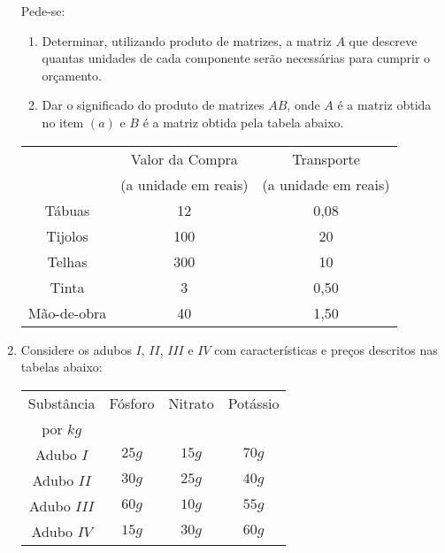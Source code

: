 \documentclass{report}
\begin{document}
\begin{Exercise}
\begin{enumerate}
Pede-se:

\begin{enumerate}
\item Determinar, utilizando produto de matrizes, a matriz $A$ que
descreve quantas unidades de cada componente serão necessárias
para cumprir o orçamento.

\item Dar o significado do produto de matrizes $AB$, onde $A$ é a
matriz obtida no item $(a)$ e $B$ é a matriz obtida pela tabela
abaixo.
\end{enumerate}


\begin{center}
\begin{tabular}
[c]{c||c|c}
 & \textrm{ Valor da Compra} & \textrm{ Transporte} \\
   & \textrm{ (a unidade em reais)} & \textrm{ (a unidade em reais)} \\
\hline\hline
\textrm{Tábuas} & 12 & 0,08 \\
\hline
\textrm{Tijolos} & 100 & 20\\
\hline
\textrm{Telhas} & 300 & 10\\
\hline
\textrm{Tinta} & 3 & 0,50\\
\hline
\textrm{Mão-de-obra} & 40 & 1,50
\end{tabular}
\end{center}




\item \label{1lista44} Considere os adubos $I$, $II$, $III$ e $IV$
com características e preços descritos nas tabelas abaixo:

\begin{center}
\begin{tabular}
[c]{c||c|c|c}
 \textrm{Substância} & \textrm{ Fósforo} & \textrm{ Nitrato} &
 \textrm{ Potássio}\\
 \textrm{por $kg$} &   &   &
  \\
 \hline\hline
\textrm{Adubo $I$} & $25g$ & $15g$ & $70g$\\
\hline
 \textrm{Adubo $II$} & $30g$ & $25g$ & $40g$\\
\hline
\textrm{Adubo $III$} & $60g$ & $10g$ & $55g$\\
\hline
\textrm{Adubo $IV$} & $15g$ & $30g$ & $60g$
\end{tabular}
\end{center}



\end{enumerate}
\end{Exercise}
\end{document}
